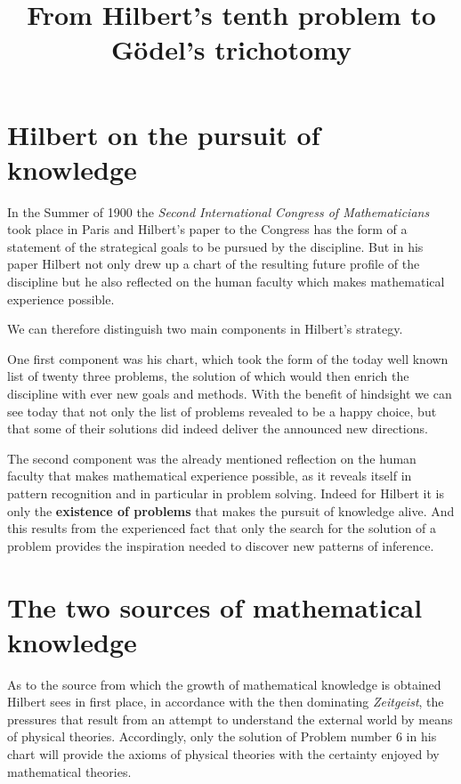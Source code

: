 \documentclass[12pt]{article}
\begin{document}
\title{From Hilbert's tenth problem to G\"odel's trichotomy}\Large 
\maketitle

\tableofcontents

\section{Hilbert on the pursuit of knowledge}\normalsize

In the Summer of 1900 the \emph{Second International Congress of Mathematicians} took place in Paris and Hilbert's paper to the Congress has the form of a statement of the strategical goals to be pursued by the discipline. But in his paper Hilbert not only drew up a chart of the resulting future profile of the discipline but he also reflected on the human faculty which makes mathematical experience possible.

We can therefore distinguish two main components in Hilbert's strategy. 

One first component was his chart, which took the form of the today well known list of twenty three problems, the solution of which would then enrich the discipline with ever new goals and methods. With the benefit of hindsight we can see today that not only the list of problems revealed to be a happy choice, but that some of their solutions did indeed deliver the announced new directions. 

The second component was the already mentioned reflection on the human faculty that makes mathematical experience possible, as it reveals itself in pattern recognition and in particular in problem solving. Indeed for Hilbert it is only the \textbf{existence of problems} that makes the pursuit of knowledge alive. And this results from the experienced fact that only the search for the solution of a problem provides the inspiration needed to discover new patterns of inference. 

\section{The two sources of mathematical knowledge}\normalsize

As to the source from which the growth of mathematical knowledge is obtained Hilbert sees in first place, in accordance with the then dominating \emph{Zeitgeist}, the pressures that result from an attempt to understand the external world by means of physical theories. Accordingly, only the solution of Problem number 6 in his chart will provide the axioms of physical theories with the certainty enjoyed by mathematical theories.
\end{document}
